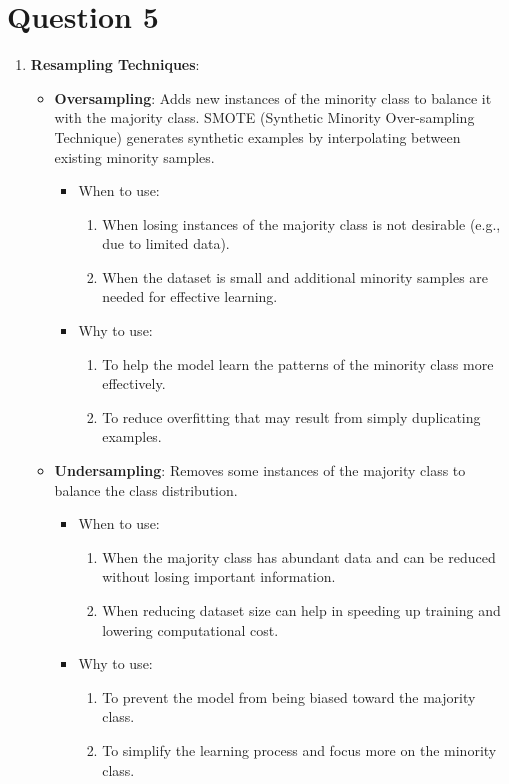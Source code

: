 \documentclass[a4paper,12pt]{article}
\begin{document}
\section*{Question 5}
\begin{enumerate}
    \item \textbf{Resampling Techniques}:
    \begin{itemize}
        \item \textbf{Oversampling}: Adds new instances of the minority class to balance it with the majority class. SMOTE (Synthetic Minority Over-sampling Technique) generates synthetic examples by interpolating between existing minority samples.
        \begin{itemize}
            \item When to use:
            \begin{enumerate}
                \item When losing instances of the majority class is not desirable (e.g., due to limited data).
                \item When the dataset is small and additional minority samples are needed for effective learning.
            \end{enumerate}
            \item Why to use:
            \begin{enumerate}
                \item To help the model learn the patterns of the minority class more effectively.
                \item To reduce overfitting that may result from simply duplicating examples.
            \end{enumerate}
        \end{itemize}
        
        \item \textbf{Undersampling}: Removes some instances of the majority class to balance the class distribution.
        \begin{itemize}
            \item When to use:
            \begin{enumerate}
                \item When the majority class has abundant data and can be reduced without losing important information.
                \item When reducing dataset size can help in speeding up training and lowering computational cost.
            \end{enumerate}
            \item Why to use:
            \begin{enumerate}
                \item To prevent the model from being biased toward the majority class.
                \item To simplify the learning process and focus more on the minority class.
            \end{enumerate}
        \end{itemize}
    \end{itemize}


\end{enumerate}
\end{document}
